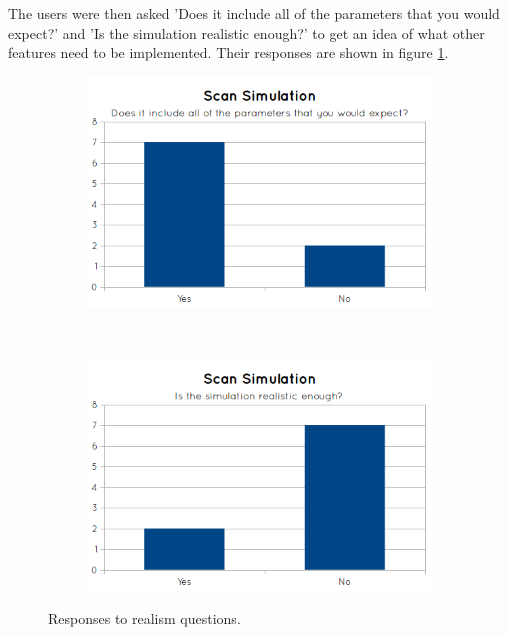 The users were then asked 'Does it include all of the parameters that you would expect?' and 'Is the simulation realistic enough?' to get an idea of what other features need to be implemented. Their responses are shown in figure \ref{fig:graph_scan_simulation23}.

\begin{figure}[H]
  \centering
  \begin{subfigure}[b]{0.5\textwidth}
    \includegraphics[width=\textwidth]{images/evaluation/graph_scan_simulation_2.png}
  \end{subfigure}%
  ~ %
  \begin{subfigure}[b]{0.5\textwidth}
    \includegraphics[width=\textwidth]{images/evaluation/graph_scan_simulation_3.png}
  \end{subfigure}
  \caption{Responses to realism questions.}\label{fig:graph_scan_simulation23}
\end{figure}

